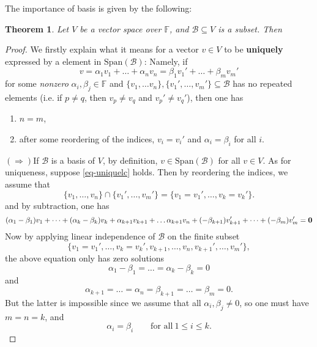 \documentclass[11pt,openany]{book}
\theoremstyle{plain}
\newtheorem{theorem}{Theorem}[chapter]
\theoremstyle{definition}
\theoremstyle{remark}
\begin{document}
The importance of basis is given by the following:
\begin{theorem} \label{thm-uniquesum}
    Let $V$ be a vector space over $\mathbb{F}$, and $\mathcal{B} \subseteq V$ is a subset. Then 
    \begin{center}
    \end{center}
\end{theorem}
\begin{proof}
    We firstly explain what it means for a vector $v \in V$ to be {\bf uniquely} expressed by a element in $\mathrm{Span}(\mathcal{B})$: Namely, if 
    \begin{equation} \label{eq-uniquelc}
    v = \alpha_1v_1 + \dots + \alpha_nv_n = \beta_1v_1' + \dots + \beta_mv_m' \tag{*}
    \end{equation}
    for some {\it nonzero} $\alpha_i, \beta_j \in \mathbb{F}$ and $\{v_1, \dots v_n\}, \{v_1', \dots, v_m'\} \subseteq \mathcal{B}$ has no repeated elements (i.e. if $p \neq q$, then $v_p \neq v_q$ and $v_p' \neq v_q'$), then one has 
    \begin{enumerate}
        \item $n = m$,
        \item after some reordering of the indices, $v_i = v_i'$ and $\alpha_i = \beta_i$ for all $i$.
    \end{enumerate}
    

    \noindent $(\Rightarrow) $If $\mathcal{B}$ is a basis of $V$, by definition, $v \in\mathrm{Span}(\mathcal{B})$ for all $v \in V$. As for uniqueness, suppose \eqref{eq-uniquelc} holds. Then by reordering the indices, we assume that
    $$\{v_1,\dots, v_n\} \cap \{v_1', \dots, v_m'\} = \{v_1 = v_1', \dots, v_k = v_k'\}.$$
    and by subtraction, one has
    $$(\alpha_1 - \beta_1)v_1 + \dots + (\alpha_k - \beta_k) v_k + \alpha_{k+1} v_{k+1} + \dots \alpha_{k+1} v_{n} + (-\beta_{k+1})v_{k+1}' + \dots + (-\beta_{m}) v_{m}' = {\bf 0}$$
    Now by applying linear independence of $\mathcal{B}$ on the finite subset
    $$\{v_1 = v_1', \dots, v_k = v_k', v_{k+1}, \dots, v_n, v_{k+1}', \dots, v_m'\},$$
    the above equation only has zero solutions
    $$\alpha_1 - \beta_1 = \dots = \alpha_k - \beta_k = 0$$
    and
    $$\alpha_{k+1} = \dots =\alpha_n = \beta_{k+1} = \dots = \beta_m = 0.$$ But the latter is impossible since we assume that all $\alpha_i, \beta_j \neq 0$, so one must have $m = n = k$, and 
    $$\alpha_i = \beta_i \quad \quad \text{for all}\ 1 \leq i \leq k.$$


\end{proof}
\end{document}
